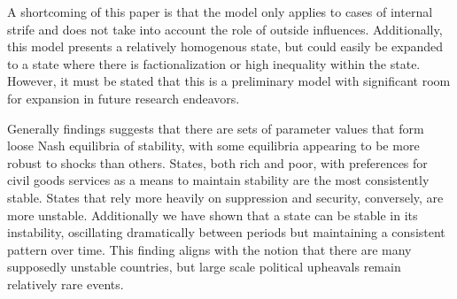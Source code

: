 \documentclass[12pt]{article}
\begin{document}
\begin{spacing}{1.5}
 
A shortcoming of this paper is that the model only applies to cases of internal strife and does not take into account the role of outside influences. Additionally, this model presents a relatively homogenous state, but could easily be expanded to a state where there is factionalization or high inequality within the state. However, it must be stated that this is a preliminary model with significant room for expansion in future research endeavors. 
 
Generally findings suggests that there are sets of parameter values that form loose Nash equilibria of stability, with some equilibria appearing to be more robust to shocks than others. States, both rich and poor, with preferences for civil goods services as a means to maintain stability are the most consistently stable. States that rely more heavily on suppression and security, conversely, are more unstable. Additionally we have shown that a state can be stable in its instability, oscillating dramatically between periods but maintaining a consistent pattern over time. This finding aligns with the notion that there are many supposedly unstable countries, but large scale political upheavals remain relatively rare events. 
 

 

\end{spacing}


\pagebreak




\nocite{*}
\end{document}

